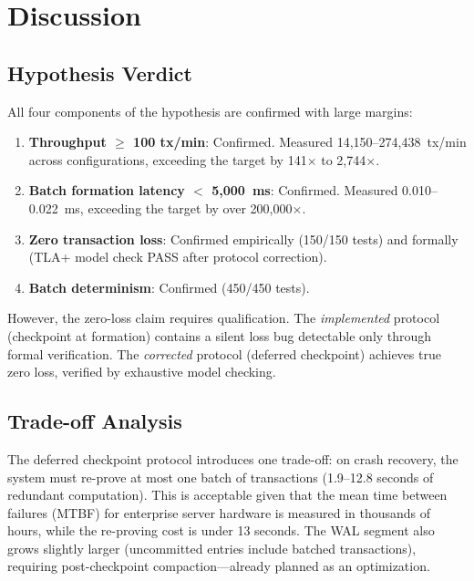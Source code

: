 
\section{Discussion}

\subsection{Hypothesis Verdict}

All four components of the hypothesis are confirmed with large margins:

\begin{enumerate}
\item \textbf{Throughput $\geq$ 100 tx/min}: Confirmed. Measured
  14,150--274,438~tx/min across configurations, exceeding the target by
  141$\times$ to 2,744$\times$.
\item \textbf{Batch formation latency $<$ 5,000~ms}: Confirmed. Measured
  0.010--0.022~ms, exceeding the target by over 200,000$\times$.
\item \textbf{Zero transaction loss}: Confirmed empirically (150/150 tests)
  and formally (TLA+ model check PASS after protocol correction).
\item \textbf{Batch determinism}: Confirmed (450/450 tests).
\end{enumerate}

However, the zero-loss claim requires qualification. The \emph{implemented}
protocol (checkpoint at formation) contains a silent loss bug detectable only
through formal verification. The \emph{corrected} protocol (deferred
checkpoint) achieves true zero loss, verified by exhaustive model checking.

\subsection{Trade-off Analysis}

The deferred checkpoint protocol introduces one trade-off: on crash recovery,
the system must re-prove at most one batch of transactions (1.9--12.8 seconds
of redundant computation). This is acceptable given that the mean time between
failures (MTBF) for enterprise server hardware is measured in thousands of
hours, while the re-proving cost is under 13 seconds. The WAL segment also
grows slightly larger (uncommitted entries include batched transactions),
requiring post-checkpoint compaction---already planned as an optimization.

